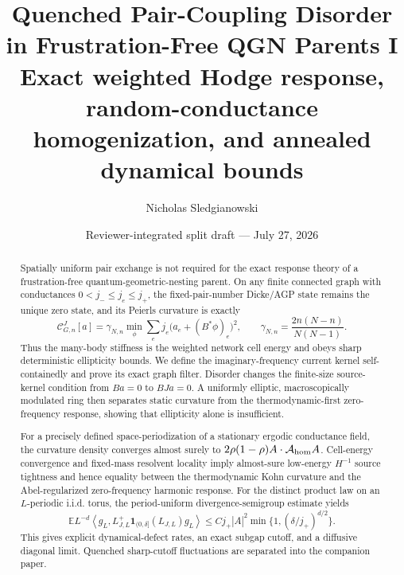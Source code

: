 \documentclass[11pt]{article}
\title{\textbf{Quenched Pair-Coupling Disorder in Frustration-Free QGN Parents I}\\[0.35em]
\large Exact weighted Hodge response, random-conductance homogenization, and annealed dynamical bounds}
\author{Nicholas Sledgianowski}
\date{Reviewer-integrated split draft --- July 27, 2026}
\theoremstyle{definition}
\theoremstyle{remark}
\newcommand{\E}{\mathbb E}
\newcommand{\cC}{\mathcal C}
\newcommand{\cA}{\mathcal A}
\newcommand{\ip}[2]{\left\langle #1,#2\right\rangle}
\newcommand{\abs}[1]{\left\lvert #1\right\rvert}
\begin{document}
\maketitle

\begin{abstract}
Spatially uniform pair exchange is not required for the exact response theory of a frustration-free quantum-geometric-nesting parent.  On any finite connected graph with conductances $0<j_-\le j_e\le j_+$, the fixed-pair-number Dicke/AGP state remains the unique zero state, and its Peierls curvature is exactly
\[
 \cC_{G,n}^{J}[a]=\gamma_{N,n}\min_{\phi}\sum_ej_e\bigl(a_e+(B^*\phi)_e\bigr)^2,
 \qquad \gamma_{N,n}=\frac{2n(N-n)}{N(N-1)}.
\]
Thus the many-body stiffness is the weighted network cell energy and obeys sharp deterministic ellipticity bounds.  We define the imaginary-frequency current kernel self-containedly and prove its exact graph filter.  Disorder changes the finite-size source-kernel condition from $Ba=0$ to $BJa=0$.  A uniformly elliptic, macroscopically modulated ring then separates static curvature from the thermodynamic-first zero-frequency response, showing that ellipticity alone is insufficient.

For a precisely defined space-periodization of a stationary ergodic conductance field, the curvature density converges almost surely to $2\rho(1-\rho)A\cdot\cA_{\rm hom}A$.  Cell-energy convergence and fixed-mass resolvent locality imply almost-sure low-energy $H^{-1}$ source tightness and hence equality between the thermodynamic Kohn curvature and the Abel-regularized zero-frequency harmonic response.  For the distinct product law on an $L$-periodic i.i.d. torus, the period-uniform divergence-semigroup estimate yields
\[
 \E L^{-d}\ip{g_L}{L_{J,L}^+\bm1_{(0,\delta]}(L_{J,L})g_L}
 \le Cj_+\abs A^2\min\{1,(\delta/j_+)^{d/2}\}.
\]
This gives explicit dynamical-defect rates, an exact subgap cutoff, and a diffusive diagonal limit.  Quenched sharp-cutoff fluctuations are separated into the companion paper.
\end{abstract}
\end{document}
